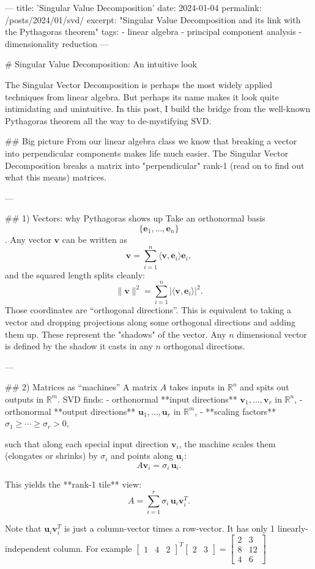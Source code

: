 ---
title: 'Singular Value Decomposition'
date: 2024-01-04
permalink: /posts/2024/01/svd/
excerpt: "Singular Value Decomposition and its link with the Pythagoras theorem"
tags:
  - linear algebra
  - principal component analysis
  - dimensionality reduction
---

# Singular Value Decomposition: An intuitive look

The Singular Vector Decomposition is perhaps the most widely applied techniques from linear algebra. But perhaps its name makes it look quite intimidating and unintuitive. In this post, I build the bridge from the well-known Pythagoras theorem all the way to de-mystifying SVD.

## Big picture 
From our linear algebra class we know that breaking a vector into perpendicular components makes life much easier. The Singular Vector Decomposition breaks a matrix into "perpendicular" rank-1 (read on to find out what this means) matrices. 

---

## 1) Vectors: why Pythagoras shows up
Take an orthonormal basis $$\{\mathbf{e}_1,\dots,\mathbf{e}_n\}$$. Any vector $\mathbf{v}$ can be written as
$$
\mathbf{v}=\sum_{i=1}^n \langle \mathbf{v},\mathbf{e}_i\rangle \mathbf{e}_i,
$$
and the squared length splits cleanly:
$$
\|\mathbf{v}\|^2=\sum_{i=1}^n \big|\langle \mathbf{v},\mathbf{e}_i\rangle\big|^2.
$$
Those coordinates are “orthogonal directions”. This is equivalent to taking a vector and dropping projections along some orthogonal directions and adding them up. These represent the "shadows" of the vector. Any $n$ dimensional vector is defined by the shadow it casts in any $n$ orthogonal directions.

---

## 2) Matrices as “machines”
A matrix $A$ takes inputs in $\mathbb{R}^n$ and spits out outputs in $\mathbb{R}^m$. SVD finds:
- orthonormal **input directions** $\mathbf{v}_1,\dots,\mathbf{v}_r$ in $\mathbb{R}^n$,
- orthonormal **output directions** $\mathbf{u}_1,\dots,\mathbf{u}_r$ in $\mathbb{R}^m$,
- **scaling factors** $\sigma_1\ge \cdots \ge \sigma_r>0$,

such that along each special input direction $\mathbf{v}_i$, the machine scales them (elongates or shrinks) by $\sigma_i$ and points along $\mathbf{u}_i$:
$$
A\mathbf{v}_i=\sigma_i\,\mathbf{u}_i.
$$

This yields the **rank-1 tile** view:
$$
A=\sum_{i=1}^r \sigma_i\,\mathbf{u}_i\mathbf{v}_i^T.
$$

Note that $\mathbf{u}_i\mathbf{v}_i^T$ is just a column-vector times a row-vector. It has only 1 linearly-independent column. For example $\begin{bmatrix} 1 & 4 & 2\end{bmatrix}^T\begin{bmatrix} 2 & 3 \end{bmatrix} =\begin{bmatrix} 2 & 3 \\ 8 & 12 \\ 4 & 6\end{bmatrix}$

